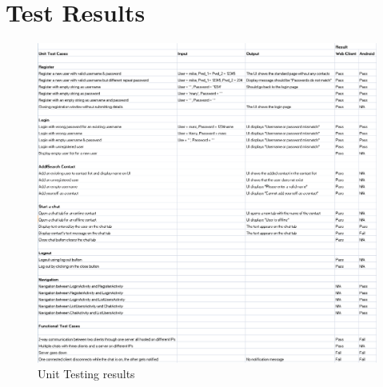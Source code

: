 \documentclass[finalReport.tex]{subfiles}
\begin{document}
\chapter{Test Results}\label{app:test}
\begin{figure}[h]
\centering
\includegraphics[scale=0.55]{test2.png}
\caption{Unit Testing results}
\end{figure}
\end{document}

